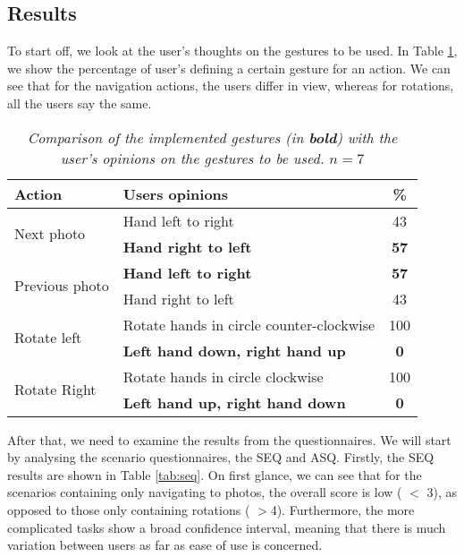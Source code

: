 \documentclass[11pt,a4paper]{article}
\begin{document}
\subsection{Results}
To start off, we look at the user's thoughts on the gestures to be used. In Table \ref{tab:compGes}, we show the percentage of user's defining a certain gesture for an action. We can see that for the navigation actions, the users differ in view, whereas for rotations, all the users say the same.
\renewcommand{\arraystretch}{1.5}
\begin{table}[h!]
\begin{center}
\begin{tabular}{l || l | c}
\textbf{Action} & \textbf{ Users opinions} & \% \\
\hline
\multirow{2}{*}{Next photo} & Hand left to right & 43 \\
 & \textbf{Hand right to left }& \textbf{57} \\
\hline
\multirow{2}{*}{Previous photo} & \textbf{Hand left to right} & \textbf{57}\\
& Hand right to left & 43\\
\hline
\multirow{2}{*}{Rotate left} & Rotate hands in circle counter-clockwise & 100 \\
& \textbf{Left hand down, right hand up} & \textbf{0} \\
\hline
\multirow{2}{*}{Rotate Right} & Rotate hands in circle clockwise & 100 \\
& \textbf{Left hand up, right hand down} & \textbf{0}
\end{tabular}
\end{center}
\caption{\textit{Comparison of the implemented gestures (in \textbf{bold}) with the user's opinions on the gestures to be used. $ n = 7$}}
\label{tab:compGes}
\end{table}


After that, we need to examine the results from the questionnaires. We will start by analysing the scenario questionnaires, the SEQ and ASQ.
Firstly, the SEQ results are shown in Table \ref{tab:seq}. On first glance, we can see that for the scenarios containing only navigating to photos, the overall score is low ( $<$ 3), as opposed to those only containing rotations ( $>$4). Furthermore, the more complicated tasks show a broad confidence interval, meaning that there is much variation between users as far as ease of use is concerned. \\
\end{document}
